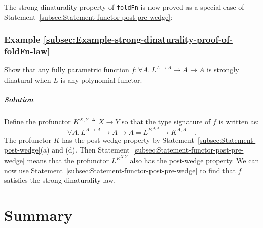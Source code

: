 The strong dinaturality property of \lstinline!foldFn! is now proved
as a special case of Statement~\ref{subsec:Statement-functor-post-pre-wedge}:

\subsubsection{Example \label{subsec:Example-strong-dinaturality-proof-of-foldFn-law}\ref{subsec:Example-strong-dinaturality-proof-of-foldFn-law}}

Show that any fully parametric function $f:\forall A.\,L^{A\rightarrow A}\rightarrow A\rightarrow A$
is strongly dinatural when $L$ is any polynomial functor.

\subparagraph{Solution}

Define the profunctor $K^{X,Y}\triangleq X\rightarrow Y$ so that
the type signature of $f$ is written as:
\[
\forall A.\,L^{A\rightarrow A}\rightarrow A\rightarrow A=L^{K^{A,A}}\rightarrow K^{A,A}\quad.
\]
The profunctor $K$ has the post-wedge property by Statement~\ref{subsec:Statement-post-wedge}(a)
and (d). Then Statement~\ref{subsec:Statement-functor-post-pre-wedge}
means that the profunctor $L^{K^{X,Y}}$ also has the post-wedge property.
We can now use Statement~\ref{subsec:Statement-functor-post-pre-wedge}
to find that $f$ satisfies the strong dinaturality law. 

\section{Summary}

